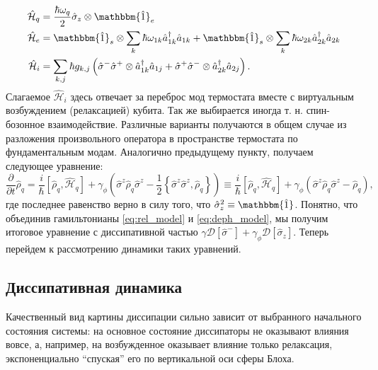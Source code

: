\documentclass[12pt, twoside]{report}
\newcommand{\rbrkt}[1]{\left( #1 \right)}
\newcommand{\sbrkt}[1]{\left[ #1 \right]}
\numberwithin{equation}{section}
\numberwithin{figure}{section}
\begin{document}
\begin{align}
\mathcal{\hat H}_{q} &= \frac{\hbar \omega_q}{2} \hat \sigma_z \otimes \mathbbm{\hat 1}_e \notag \\
\mathcal{\hat H}_{e} &= \mathbbm{\hat 1}_s \otimes \sum_k \hbar \omega_{1k} \hat a_{1k}^\dag \hat a_{1k}  + \mathbbm{\hat 1}_s \otimes \sum_k \hbar \omega_{2k} \hat a_{2k}^\dag \hat a_{2k} 
\label{eq:deph_model}
\\
\mathcal{\hat H}_i &= \sum_{k,j} \hbar g_{k,j} \rbrkt{\hat \sigma^-\hat\sigma^+ \otimes \hat a_{1k}^\dag \hat a_{1j} +  \hat \sigma^+\hat\sigma^- \otimes \hat a_{2k}^\dag \hat a_{2j}} \notag.
\end{align}	
Слагаемое $\mathcal{\hat H}_i$ здесь отвечает за переброс мод термостата вместе с виртуальным возбуждением (релаксацией) кубита. Так же выбирается иногда т. н. спин-бозонное взаимодействие\cite{leggett1987}. Различные варианты получаются в общем случае из разложения произвольного оператора в пространстве термостата по фундаментальным модам\cite{hsu1987}. Аналогично предыдущему пункту, получаем следующее уравнение:
\begin{equation}
\frac{\partial}{\partial t}\hat \rho_q = \frac{i}{\hbar}\sbrkt{\hat \rho_q, \mathcal{\hat H}_q} +
\gamma_\phi (\hat \sigma^z \hat \rho_q \hat \sigma^z - \frac{1}{2} \left\{ \hat\sigma^z\hat\sigma^z, \hat \rho_q \right\} ) \equiv \frac{i}{\hbar}\sbrkt{\hat \rho_q, \mathcal{\hat H}_q} +
\gamma_\phi (\hat \sigma^z \hat \rho_q \hat \sigma^z -\hat \rho_q ),
\end{equation}
где последнее равенство верно в силу того, что $\hat \sigma_z^2 \equiv \mathbbm{\hat 1}$. Понятно, что объединив гамильтонианы \eqref{eq:rel_model} и \eqref{eq:deph_model}, мы получим итоговое уравнение с диссипативной частью $\gamma\mathcal{D} \sbrkt{\hat \sigma^- }+\gamma_\phi \mathcal{D} \sbrkt{\hat \sigma_z} $. Теперь перейдем к рассмотрению динамики таких уравнений.



\subsection{Диссипативная динамика}

Качественный вид картины диссипации сильно зависит от выбранного начального состояния системы: на основное состояние диссипаторы не оказывают влияния вовсе, а, например, на возбужденное оказывает влияние только релаксация, экспоненциально ``спуская'' его по вертикальной оси сферы Блоха. 
\end{document}
